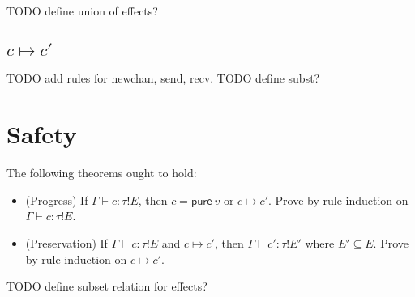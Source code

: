 \documentclass[12pt]{article}
\begin{document}
TODO define union of effects?

\subsection{$c \mapsto c'$}

\begin{mathpar}






\end{mathpar}

TODO add rules for newchan, send, recv. TODO define subst?

\newpage
\section{Safety}

The following theorems ought to hold:

\begin{itemize}
\item (Progress) If $\Gamma \vdash c : \tau!E$, then $c = \textsf{pure} \ v$ or
$c \mapsto c'$. Prove by rule induction on $\Gamma \vdash c : \tau!E$.
\item (Preservation) If $\Gamma \vdash c : \tau!E$ and $c \mapsto c'$, then
$\Gamma \vdash c' : \tau!E'$ where $E' \subseteq E$. Prove by rule induction on
$c \mapsto c'$.
\end{itemize}

TODO define subset relation for effects?
\end{document}
